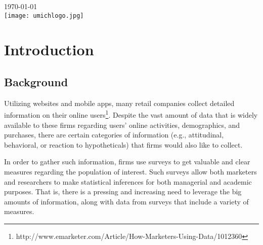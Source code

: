 \begin{titlepage}
{\large \today}\\[2cm] %


\texttt{[image: umichlogo.jpg]}\\[1cm] %
 



\vfill %

\end{titlepage}


\section{Introduction}
\subsection{Background}

Utilizing websites and mobile apps, many retail companies collect detailed information on their online users\footnote{http://www.emarketer.com/Article/How-Marketers-Using-Data/1012360}. Despite the vast amount of data that is widely available to these firms regarding users’ online activities, demographics, and purchases, there are certain categories of information (e.g., attitudinal, behavioral, or reaction to hypotheticals) that firms would also like to collect. 

In order to gather such information, firms use surveys to get valuable and clear measures regarding the population of interest. Such surveys allow both marketers and researchers to make statistical inferences for both managerial and academic purposes. That is, there is a pressing and increasing need to leverage the big amounts of information, along with data from surveys that include a variety of measures.

